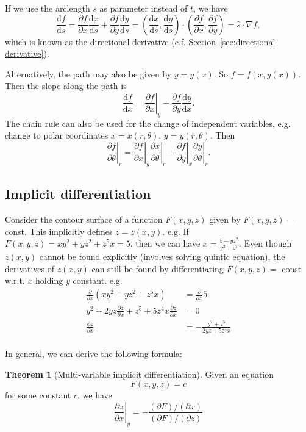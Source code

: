 \documentclass[a4paper]{article}
\theoremstyle{definition}
\newtheorem*{thm}{Theorem}
\renewcommand{\d}{\mathrm{d}}
\begin{document}
If we use the arclength $s$ as parameter instead of $t$, we have 
\[
\frac{\d f}{\d s} = \frac{\partial f}{\partial x}\frac{\d x}{\d s} + \frac{\partial f}{\partial y}\frac{\d y}{\d s} = \left(\frac{\d x}{\d s}, \frac{\d y}{\d s}\right)\cdot \left(\frac{\partial f}{\partial x}, \frac{\partial f}{\partial y}\right) = \hat{s}\cdot \nabla f,
\]
which is known as the directional derivative (c.f. Section~\ref{sec:directional-derivative}).

Alternatively, the path may also be given by $y = y(x)$. So $f = f(x, y(x))$. Then the slope along the path is
\[
\frac{\d f}{\d x} = \left.\frac{\partial f}{\partial x}\right|_y + \frac{\partial f}{\partial y}{\frac{\d y}{\d x}}.
\]
The chain rule can also be used for the change of independent variables, e.g. change to polar coordinates $x = x(r, \theta)$, $y = y(r, \theta)$. Then 
\[
\left.\frac{\partial f}{\partial \theta}\right|_r = \left. \frac{\partial f}{\partial x}\right|_y \left.\frac{\partial x}{\partial \theta}\right|_r + \left.\frac{\partial f}{\partial y}\right|_x\left.\frac{\partial y}{\partial \theta}\right|_r.
\]
\subsection{Implicit differentiation}
Consider the contour surface of a function $F(x, y, z)$ given by $F(x, y, z) = $ const. This implicitly defines $z = z(x, y)$. e.g. If $F(x, y, z) = xy^2 + yz^2 + z^5x = 5$, then we can have $x = \frac{5 - yz^2}{y^2 + z^5}$. Even though $z(x, y)$ cannot be found explicitly (involves solving quintic equation), the derivatives of $z(x, y)$ can still be found by differentiating $F(x, y, z) =$ const w.r.t. $x$ holding $y$ constant. e.g.
\begin{align*}
  \frac{\partial }{\partial x}(xy^2 + yz^2 + z^5x) &= \frac{\partial }{\partial x}5\\
  y^2 + 2yz\frac{\partial z}{\partial x} + z^5 + 5z^4x\frac{\partial z}{\partial x} &= 0\\
  \frac{\partial z}{\partial x} &= -\frac{y^2 + z^5}{2yz + 5z^4x}\\
\end{align*}

In general, we can derive the following formula:
\begin{thm}[Multi-variable implicit differentiation] Given an equation 
  \[
  F(x, y, z) = c
  \]
  for some constant $c$, we have
  \[
  \left.\frac{\partial z}{\partial x}\right|_y = -\frac{(\partial F)/(\partial x)}{(\partial F)/(\partial z)}
  \]
\end{thm}
\end{document}

